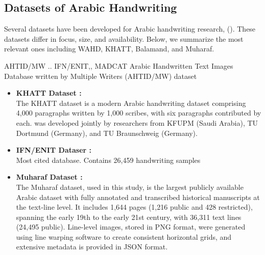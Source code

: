 \documentclass[conference]{IEEEtran}
\begin{document}
\subsection{}





\subsection{Datasets of Arabic Handwriting}

Several datasets have been developed for Arabic handwriting research, (). These datasets differ in focus, size, and availability. Below, we summarize the most relevant ones including WAHD, KHATT, Balamand, and Muharaf.



AHTID/MW .. IFN/ENIT,, MADCAT
Arabic Handwritten Text Images Database written by Multiple Writers (AHTID/MW) dataset




\begin{itemize}
  
    \item \textbf{KHATT Dataset \cite{mahmoud2014khatt}:} \\ 
    The KHATT dataset is a modern Arabic handwriting dataset comprising 4,000 paragraphs written by 1,000 scribes, with six paragraphs contributed by each.  was developed jointly by researchers from KFUPM (Saudi Arabia), TU Dortmund (Germany), and TU Braunschweig (Germany). 



    \item \textbf{IFN/ENIT Dataser \cite{mahmoud2014khatt}:} \\
    Most cited database. Contains 26,459 handwriting samples


    \item \textbf{Muharaf Dataset \cite{saeed2024muharaf}:} \\
    The Muharaf dataset, used in this study, is the largest publicly available Arabic dataset with fully annotated and transcribed historical manuscripts at the text-line level. It includes 1,644 pages (1,216 public and 428 restricted), spanning the early 19th to the early 21st century, with 36,311 text lines (24,495 public). Line-level images, stored in PNG format, were generated using line warping software to create consistent horizontal grids, and extensive metadata is provided in JSON format.
  
\end{itemize}
\end{document}
